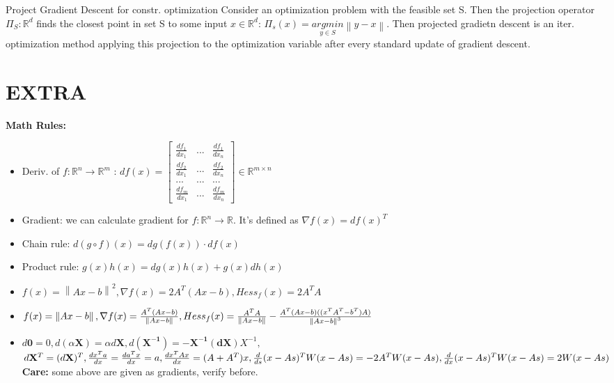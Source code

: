 \documentclass[a4paper]{article}
\begin{document}
\begin{mainbox}{Project Gradient Descent for constr. optimization}
    Consider an optimization problem with the feasible set S. Then the projection operator $\Pi_S : \mathbb{R}^d$ finds the closest point in set S to some input $x \in \mathbb{R}^d$: $\Pi_s(x) = \underset{y\in S}{argmin } \left\lVert y - x\right\rVert $. Then projected gradietn descent is an iter. optimization method applying this projection to the optimization variable after every standard update of gradient descent.   
\end{mainbox}

\section{EXTRA}
\textbf{Math Rules:} 
\begin{itemize}
    \item Deriv. of $f:\mathbb{R}^n \to \mathbb{R}^m$ :
    $ df(x) = \left[\begin{smallmatrix} 
        \frac{df_1}{dx_1} & ... & \frac{df_1}{dx_n}\\
        \frac{df_2}{dx_1} & ... & \frac{df_2}{dx_n}\\
        ... & ... & ... \\
        \frac{df_m}{dx_1} & ... & \frac{df_m}{dx_n}
    \end{smallmatrix}\right] \in \mathbb{R}^{m\times n}$ 
    \item Gradient: we can calculate gradient for $f: \mathbb{R}^n \to \mathbb{R}$. It's defined as $\nabla f(x) = df(x)^T$ 
    \item Chain rule: $d(g\circ f)(x) = dg(f(x)) \cdot df(x)$ 
    \item Product rule: $g(x)h(x) = dg(x)h(x) + g(x)dh(x)$ 
    \item $f(x)= \left\lVert Ax-b\right\rVert ^2, \nabla f(x) = 2A^T(Ax-b), Hess_f(x) = 2A^TA$
    \item $f(x) = \left\lVert Ax-b\right\rVert, \nabla f(x) = \frac{A^T(Ax-b)}{\left\lVert Ax-b\right\rVert}, \\ Hess_f(x)= \frac{A^TA}{\left\lVert Ax-b\right\rVert }  - \frac{A^T(Ax-b)((x^TA^T-b^T)A)}{\left\lVert Ax-b\right\rVert^3 }$  
    \item $d\mathbf{0} = 0, d(\alpha \mathbf{X}) = \alpha d\mathbf{X}, d(\mathbf{X^{-1}}) = -\mathbf{X^{-1}}(\mathbf{dX})X^{-1},$\\
     $d\mathbf{X}^T = (d\mathbf{X})^T, \frac{dx^Ta}{dx} = \frac{da^Tx}{dx} =a, \frac{dx^TAx}{dx}= (A+A^T)x, \\
     \frac{d}{ds}(x-As)^TW(x-As) = -2A^TW(x-As), \\ \frac{d}{dx}(x-As)^TW(x-As) = 2W(x-As)$ 
     \textbf{Care:} some above are given as gradients, verify before.    
\end{itemize}
\end{document}
